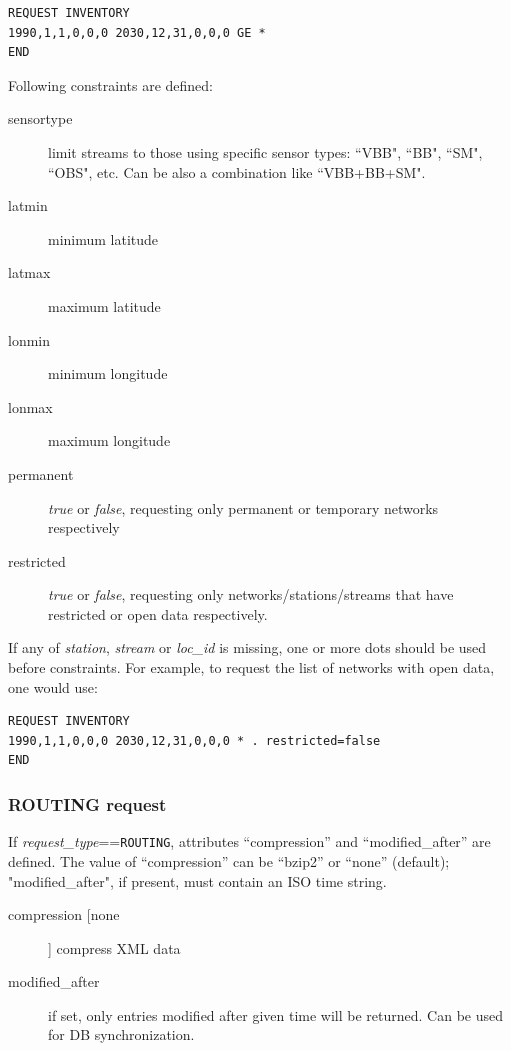 \documentclass[11pt,a4paper,titlepage]{article}
\newcommand{\dfl}[1]{[#1]}
\begin{document}
\begin{verbatim}
REQUEST INVENTORY
1990,1,1,0,0,0 2030,12,31,0,0,0 GE *
END
\end{verbatim}

Following constraints are defined:
\begin{description}
\item[sensortype] limit streams to those using specific sensor types: ``VBB", 
    ``BB", ``SM", ``OBS", etc. Can be also a combination like ``VBB+BB+SM".
\item[latmin] minimum latitude
\item[latmax] maximum latitude
\item[lonmin] minimum longitude
\item[lonmax] maximum longitude
\item[permanent] \emph{true} or \emph{false}, requesting only permanent or
    temporary networks respectively
\item[restricted] \emph{true} or \emph{false}, requesting only
    networks/stations/streams that have restricted or open data respectively.
\end{description}

If any of \emph{station}, \emph{stream} or \emph{loc\_id} is missing, one
or more dots should be used before constraints. For example, to request the
list of networks with open data, one would use:

\begin{verbatim}
REQUEST INVENTORY
1990,1,1,0,0,0 2030,12,31,0,0,0 * . restricted=false
END
\end{verbatim}


\subsubsection{ROUTING request}

If \emph{request\_type}==\texttt{ROUTING}, attributes ``compression'' and
``modified\_after'' are defined. The value of ``compression'' can be
``bzip2'' or ``none'' (default); "modified\_after", if present, must
contain an ISO time string.

\begin{description}
\item[compression \dfl{none}] compress XML data
\item[modified\_after] if set, only entries modified after given time will be
    returned. Can be used for DB synchronization.
\end{description}
\end{document}
